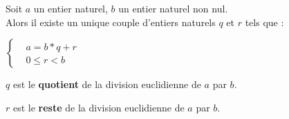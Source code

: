 \documentclass[12pt,twoside,a4paper]{article}
\author{MPSI 2}
\begin{document}
	\maketitle
	\begin{prop}
		Soit $a$ un entier naturel, $b$ un entier naturel non nul. \\
		Alors il existe un unique couple d'entiers naturels $q$ et $r$ tels que : \\
		\begin{tab}
			$\left\{\begin{aligned}&a=b*q+r\\
									&0\leq r<b\end{aligned}\right.$
		\end{tab}
		\begin{liste}
			\item $q$ est le \textbf{quotient} de la division euclidienne de $a$ par $b$.
			\item $r$ est le \textbf{reste} de la division euclidienne de $a$ par $b$.
		\end{liste}
	\end{prop}
\end{document}
